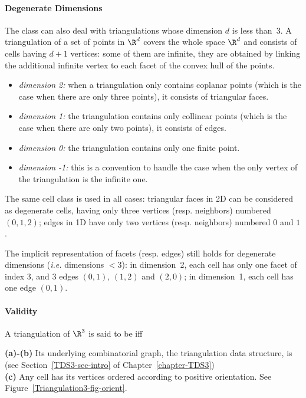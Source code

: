 \paragraph{Degenerate Dimensions}
The class  can also deal with
triangulations whose dimension $d$ is less than~3. A triangulation of a
set of points in $\R^d$ covers the whole space $\R^d$ and consists of
cells having $d+1$ vertices: some of them are infinite, they are
obtained by linking the additional infinite vertex to each facet of
the convex hull of the points.
\begin{itemize}
\item {} \emph{dimension 2:} when a triangulation only contains
coplanar points (which is the case when there are only three points), 
it consists of triangular faces.
\item {} \emph{dimension 1:} the triangulation contains only collinear 
points (which is the case when there are only two points), it consists
of edges.
\item {} \emph{dimension 0:} the triangulation contains only one
finite point.
\item {} \emph{dimension -1:} this is a convention to handle the case
when the only vertex of the triangulation is the infinite one.
\end{itemize} 

The same cell class is used in all cases: triangular faces in
2D can be considered as degenerate cells, having only three vertices
(resp. neighbors) numbered $(0,1,2)$;
edges in 1D have only two vertices (resp. neighbors) numbered $0$ and $1$. 

The implicit representation of facets (resp. edges) still holds
for degenerate dimensions (\textit{i.e.} dimensions $<3$): in
dimension~2, each cell has only one facet of index 3, and 3 edges
$(0,1)$, $(1,2)$ and $(2,0)$; in dimension~1, each cell has one edge
$(0,1)$.  

\paragraph{Validity}
A triangulation of $\R^3$ is said to be  iff

{\bf (a)-(b)} Its underlying combinatorial graph, the triangulation
data structure, is  
(see Section~\ref{TDS3-sec-intro} of Chapter~\ref{chapter-TDS3})\\
{\bf (c)} Any cell has its vertices ordered according to positive
orientation. See Figure~\ref{Triangulation3-fig-orient}.

